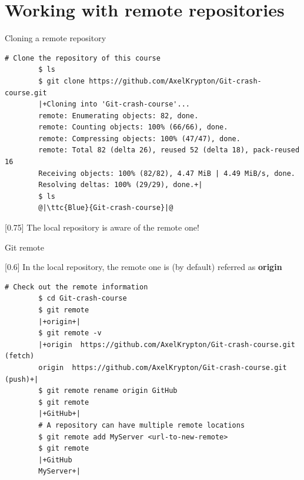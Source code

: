 \documentclass[usenames,svgnames,14pt]{beamer}
\newcommand{\ttc}[2]{\texttt{\textcolor{#1}{#2}}}%
\begin{document}
\section{Working with remote repositories}
\begin{frame}[fragile]{Cloning a remote repository}
    \begin{lstlisting}[style=MyBash, xleftmargin=-1mm, xrightmargin=-1mm]
        # Clone the repository of this course
        $ ls
        $ git clone https://github.com/AxelKrypton/Git-crash-course.git
        |+Cloning into 'Git-crash-course'...
        remote: Enumerating objects: 82, done.
        remote: Counting objects: 100% (66/66), done.
        remote: Compressing objects: 100% (47/47), done.
        remote: Total 82 (delta 26), reused 52 (delta 18), pack-reused 16
        Receiving objects: 100% (82/82), 4.47 MiB | 4.49 MiB/s, done.
        Resolving deltas: 100% (29/29), done.+|
        $ ls
        @|\ttc{Blue}{Git-crash-course}|@
    \end{lstlisting}
    \vspace{2mm}
    \begin{varblock}{}[0.75\textwidth]{}
        The local repository is aware of the remote one!
    \end{varblock}
    \PrepareURLsymbol[PB]
\end{frame}
\begin{frame}[fragile]{Git remote}
    \vspace{-3mm}
    \begin{varblock}{}[0.6\textwidth]{}
        In the local repository, the remote one is (by default) referred as \textbf{origin}
    \end{varblock}
    \begin{lstlisting}[style=MyBash, xleftmargin=-3mm, xrightmargin=-3mm]
        # Check out the remote information
        $ cd Git-crash-course
        $ git remote
        |+origin+|
        $ git remote -v
        |+origin  https://github.com/AxelKrypton/Git-crash-course.git (fetch)
        origin  https://github.com/AxelKrypton/Git-crash-course.git (push)+|
        $ git remote rename origin GitHub
        $ git remote
        |+GitHub+|
        # A repository can have multiple remote locations
        $ git remote add MyServer <url-to-new-remote>
        $ git remote
        |+GitHub
        MyServer+|
    \end{lstlisting}
\end{frame}
\end{document}
